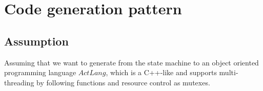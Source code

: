 \section{Code generation pattern}
\label{sec:codegen}


\subsection{Assumption}
Assuming that we want to generate from the state machine to an object oriented programming language $ActLang$, which is a C++-like and supports multi-threading by following functions and resource control as mutexes.
